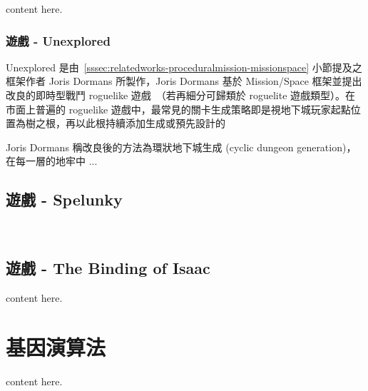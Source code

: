 content here.

\subsubsection{遊戲 - Unexplored}
\label{sssec:relatedworks-gameswithprocedural-unexplored}

Unexplored 是由~\ref{sssec:relatedworks-proceduralmission-missionspace} 小節提及之框架作者 Joris Dormans 所製作，Joris Dormans 基於 Mission/Space 框架並提出改良的即時型戰鬥 roguelike 遊戲~\cite{dormansUnexplored}（若再細分可歸類於 roguelite 遊戲類型）。在市面上普遍的 roguelike 遊戲中，最常見的關卡生成策略即是視地下城玩家起點位置為樹之根，再以此根持續添加生成或預先設計的

Joris Dormans 稱改良後的方法為環狀地下城生成 (cyclic dungeon generation)，在每一層的地牢中 ...

\subsection{遊戲 - Spelunky}
\label{ssec:relatedworks-gameswithprocedural-spelunky}

~\cite{SpelunkyGL01}~\cite{SpelunkyGL02}

\subsection{遊戲 - The Binding of Isaac}
\label{ssec:relatedworks-gameswithprocedural-isaac}

content here.


\section{基因演算法}
\label{sec:ga}

content here.
